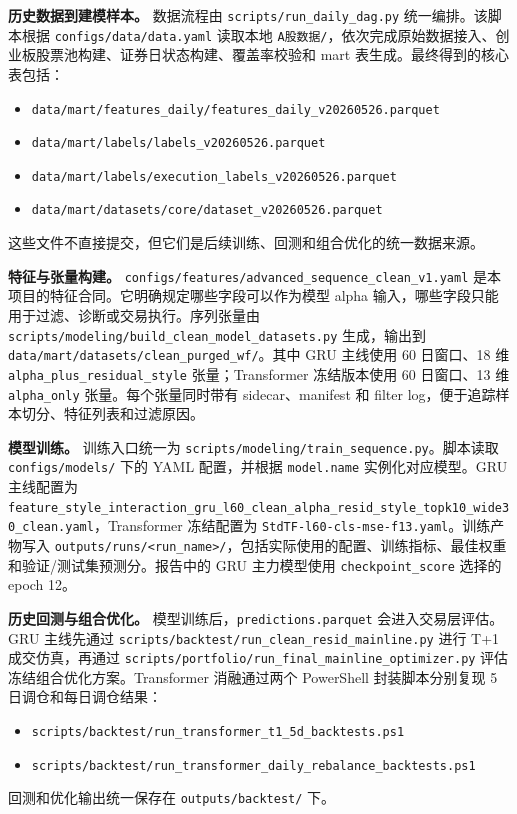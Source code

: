 \documentclass[12pt,a4paper,cn,bibtex]{elegantpaper}
\newcommand{\codepath}[1]{\nolinkurl{#1}}
\begin{document}
\textbf{历史数据到建模样本。} 数据流程由 \codepath{scripts/run_daily_dag.py} 统一编排。该脚本根据 \codepath{configs/data/data.yaml} 读取本地 \texttt{A股数据/}，依次完成原始数据接入、创业板股票池构建、证券日状态构建、覆盖率校验和 mart 表生成。最终得到的核心表包括：
\begin{itemize}
    \item \codepath{data/mart/features_daily/features_daily_v20260526.parquet}
    \item \codepath{data/mart/labels/labels_v20260526.parquet}
    \item \codepath{data/mart/labels/execution_labels_v20260526.parquet}
    \item \codepath{data/mart/datasets/core/dataset_v20260526.parquet}
\end{itemize}
这些文件不直接提交，但它们是后续训练、回测和组合优化的统一数据来源。

\textbf{特征与张量构建。} \codepath{configs/features/advanced_sequence_clean_v1.yaml} 是本项目的特征合同。它明确规定哪些字段可以作为模型 alpha 输入，哪些字段只能用于过滤、诊断或交易执行。序列张量由 \codepath{scripts/modeling/build_clean_model_datasets.py} 生成，输出到 \codepath{data/mart/datasets/clean_purged_wf/}。其中 GRU 主线使用 60 日窗口、18 维 \texttt{alpha\_plus\_residual\_style} 张量；Transformer 冻结版本使用 60 日窗口、13 维 \texttt{alpha\_only} 张量。每个张量同时带有 sidecar、manifest 和 filter log，便于追踪样本切分、特征列表和过滤原因。

\textbf{模型训练。} 训练入口统一为 \codepath{scripts/modeling/train_sequence.py}。脚本读取 \codepath{configs/models/} 下的 YAML 配置，并根据 \texttt{model.name} 实例化对应模型。GRU 主线配置为 \codepath{feature_style_interaction_gru_l60_clean_alpha_resid_style_topk10_wide30_clean.yaml}，Transformer 冻结配置为 \codepath{StdTF-l60-cls-mse-f13.yaml}。训练产物写入 \codepath{outputs/runs/<run_name>/}，包括实际使用的配置、训练指标、最佳权重和验证/测试集预测分。报告中的 GRU 主力模型使用 \texttt{checkpoint\_score} 选择的 epoch 12。

\textbf{历史回测与组合优化。} 模型训练后，\codepath{predictions.parquet} 会进入交易层评估。GRU 主线先通过 \codepath{scripts/backtest/run_clean_resid_mainline.py} 进行 T+1 成交仿真，再通过 \codepath{scripts/portfolio/run_final_mainline_optimizer.py} 评估冻结组合优化方案。Transformer 消融通过两个 PowerShell 封装脚本分别复现 5 日调仓和每日调仓结果：
\begin{itemize}
    \item \codepath{scripts/backtest/run_transformer_t1_5d_backtests.ps1}
    \item \codepath{scripts/backtest/run_transformer_daily_rebalance_backtests.ps1}
\end{itemize}
回测和优化输出统一保存在 \codepath{outputs/backtest/} 下。
\end{document}
